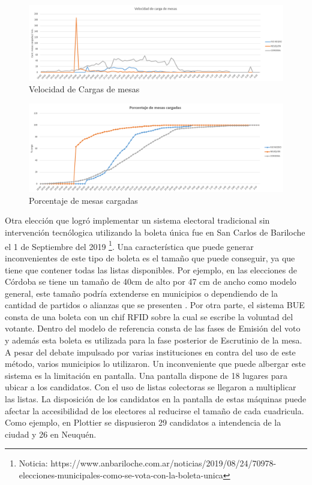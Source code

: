 \begin{figure}[h!]
  \includegraphics[width=\textwidth]{img/grafico_velocidad_carga.png}
  \caption{Velocidad de Cargas de mesas}
  \label{fig:velocidad}
\end{figure}
\begin{figure}[h!]
  \includegraphics[width=\textwidth]{img/carga_mesas.png}
  \caption{Porcentaje de mesas cargadas}
  \label{fig:acumulado}
\end{figure}

Otra elección que logró implementar un sistema electoral tradicional sin intervención tecnólogica utilizando la boleta única fue en San Carlos de Bariloche el 1 de Septiembre del 2019 \footnote{Noticia: https://www.anbariloche.com.ar/noticias/2019/08/24/70978-elecciones-municipales-como-se-vota-con-la-boleta-unica}. Una característica que puede generar inconvenientes de este tipo de boleta es el tamaño que puede conseguir, ya que tiene que contener todas las listas disponibles. Por ejemplo, en las elecciones de Córdoba se tiene un tamaño de 40cm de alto por 47 cm de ancho como modelo general, este tamaño podría extenderse en municipios o dependiendo de la cantidad de partidos o alianzas que se presenten \cite{boletaUnicaTamanio}. \newline
Por otra parte, el sistema BUE consta de una boleta con un chif RFID sobre la cual se escribe la voluntad del votante. Dentro del modelo de referencia consta de las fases de Emisión del voto y además esta boleta es utilizada para la fase posterior de Escrutinio de la mesa. A pesar del debate impulsado por varias instituciones en contra del uso de este método, varios municipios lo utilizaron. Un inconveniente que puede albergar este sistema es la limitación en pantalla. Una pantalla dispone de 18 lugares para ubicar a los candidatos. Con el uso de listas colectoras se llegaron a multiplicar las listas. La disposición de los candidatos en la pantalla de estas máquinas puede afectar la accesibilidad de los electores al reducirse el tamaño de cada cuadricula. Como ejemplo, en Plottier \cite{lmncolectoras} se dispusieron 29 candidatos a intendencia de la ciudad y 26 en Neuquén. 
